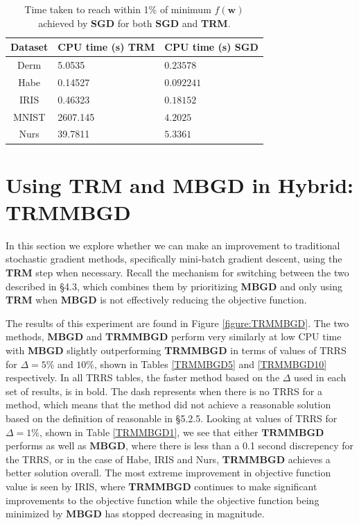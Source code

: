 \documentclass[letterpaper,12pt,titlepage,oneside,final]{book}
\begin{document}
	\begin{table}[h] 
		\centering 
		\begin{tabular}{ |c|l|l| } 
			\hline 
			\textbf{Dataset} & CPU time (s) \textbf{TRM} & CPU time (s) \textbf{SGD}\\ 
			\hline 
			Derm &5.0535 & $\mathbf{0.23578}$\\ 
			\hline 
			Habe &0.14527 & $\mathbf{0.092241}$\\ 
			\hline 
			IRIS &0.46323 & $\mathbf{0.18152}$\\ 
			\hline 
			MNIST &2607.145 & $\mathbf{4.2025}$\\ 
			\hline 
			Nurs &39.7811 & $\mathbf{5.3361}$\\ 
			\hline 
		\end{tabular} 
		\caption{Time taken to reach within 1\% of minimum $f(\mathbf{w})$ achieved by \textbf{SGD} for both \textbf{SGD} and \textbf{TRM}.} \label{t_trm_sgd} \end{table}
	
	\section{Using TRM and MBGD in Hybrid: TRMMBGD}
	
	In this section we explore whether we can make an improvement to traditional stochastic gradient methods, specifically mini-batch gradient descent, using the \textbf{TRM} step when necessary. Recall the mechanism for switching between the two described in \S{4.3}, which combines them by prioritizing \textbf{MBGD} and only using \textbf{TRM} when \textbf{MBGD} is not effectively reducing the objective function. 
	
	The results of this experiment are found in Figure \ref{figure:TRMMBGD}. The two methods, \textbf{MBGD} and \textbf{TRMMBGD} perform very similarly at low CPU time with \textbf{MBGD} slightly outperforming \textbf{TRMMBGD} in terms of values of TRRS for $\Delta=5\%$ and $10\%$, shown in Tables \ref{TRMMBGD5} and \ref{TRMMBGD10} respectively.  In all TRRS tables, the faster method based on the $\Delta$ used in each set of results, is in bold. The dash represents when there is no TRRS for a method, which means that the method did not achieve a reasonable solution based on the definition of reasonable in \S{5.2.5}. Looking at values of TRRS for $\Delta=1\%$, shown in Table \ref{TRMMBGD1}, we see that either $\textbf{TRMMBGD}$ performs as well as $\mathbf{MBGD}$, where there is less than a 0.1 second discrepency for the TRRS, or in the case of Habe, IRIS and Nurs, \textbf{TRMMBGD} achieves a better solution overall. The most extreme improvement in objective function value is seen by IRIS, where \textbf{TRMMBGD} continues to make significant improvements to the objective function while the objective function being minimized by \textbf{MBGD} has stopped decreasing in magnitude.
	
\end{document}
